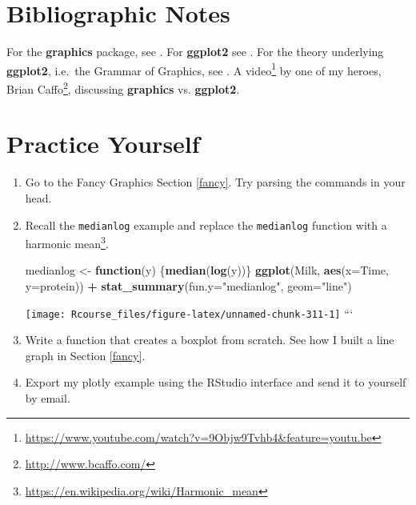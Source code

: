 \documentclass[]{book}
\newenvironment{Shaded}{\begin{snugshade}}{\end{snugshade}}
\newcommand{\ControlFlowTok}[1]{\textcolor[rgb]{0.13,0.29,0.53}{\textbf{#1}}}
\newcommand{\DataTypeTok}[1]{\textcolor[rgb]{0.13,0.29,0.53}{#1}}
\newcommand{\KeywordTok}[1]{\textcolor[rgb]{0.13,0.29,0.53}{\textbf{#1}}}
\newcommand{\NormalTok}[1]{#1}
\newcommand{\OperatorTok}[1]{\textcolor[rgb]{0.81,0.36,0.00}{\textbf{#1}}}
\newcommand{\StringTok}[1]{\textcolor[rgb]{0.31,0.60,0.02}{#1}}
\renewcommand{\href}[2]{#2\footnote{\url{#1}}}
\theoremstyle{definition}
\theoremstyle{definition}
\theoremstyle{definition}
\theoremstyle{remark}
\begin{document}
\hypertarget{bibliographic-notes-10}{%
\section{Bibliographic Notes}\label{bibliographic-notes-10}}

For the \textbf{graphics} package, see \citet{Rlanguage}.
For \textbf{ggplot2} see \citet{ggplot2}.
For the theory underlying \textbf{ggplot2}, i.e.~the Grammar of Graphics, see \citet{wilkinson2006grammar}.
A \href{https://www.youtube.com/watch?v=9Objw9Tvhb4\&feature=youtu.be}{video} by one of my heroes, \href{http://www.bcaffo.com/}{Brian Caffo}, discussing \textbf{graphics} vs. \textbf{ggplot2}.

\hypertarget{practice-yourself-8}{%
\section{Practice Yourself}\label{practice-yourself-8}}

\begin{enumerate}
\def\labelenumi{\arabic{enumi}.}
\item
  Go to the Fancy Graphics Section \ref{fancy}. Try parsing the commands in your head.
\item
  Recall the \texttt{medianlog} example and replace the \texttt{medianlog} function with a \href{https://en.wikipedia.org/wiki/Harmonic_mean}{harmonic mean}.

\begin{Shaded}
\begin{Highlighting}[]
\NormalTok{medianlog <-}\StringTok{ }\ControlFlowTok{function}\NormalTok{(y) \{}\KeywordTok{median}\NormalTok{(}\KeywordTok{log}\NormalTok{(y))\}}
\KeywordTok{ggplot}\NormalTok{(Milk, }\KeywordTok{aes}\NormalTok{(}\DataTypeTok{x=}\NormalTok{Time, }\DataTypeTok{y=}\NormalTok{protein)) }\OperatorTok{+}
\StringTok{  }\KeywordTok{stat_summary}\NormalTok{(}\DataTypeTok{fun.y=}\StringTok{"medianlog"}\NormalTok{, }\DataTypeTok{geom=}\StringTok{"line"}\NormalTok{)}
\end{Highlighting}
\end{Shaded}

  \texttt{[image: Rcourse\_files/figure-latex/unnamed-chunk-311-1]}
  ```
\item
  Write a function that creates a boxplot from scratch. See how I built a line graph in Section \ref{fancy}.
\item
  Export my plotly example using the RStudio interface and send it to yourself by email.
\end{enumerate}
\end{document}
